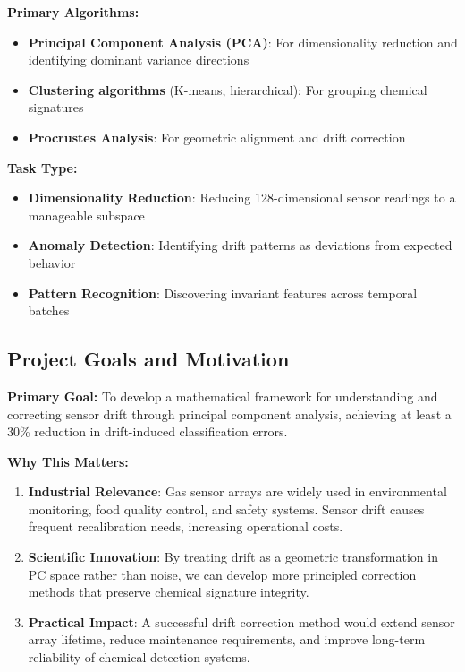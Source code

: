 \documentclass[
  letterpaper,
  DIV=11,
  numbers=noendperiod]{scrartcl}
\providecommand{\tightlist}{%
  \setlength{\itemsep}{0pt}\setlength{\parskip}{0pt}}
\begin{document}
\textbf{Primary Algorithms:}

\begin{itemize}
\tightlist
\item
  \textbf{Principal Component Analysis (PCA)}: For dimensionality
  reduction and identifying dominant variance directions
\item
  \textbf{Clustering algorithms} (K-means, hierarchical): For grouping
  chemical signatures
\item
  \textbf{Procrustes Analysis}: For geometric alignment and drift
  correction
\end{itemize}

\textbf{Task Type:}

\begin{itemize}
\tightlist
\item
  \textbf{Dimensionality Reduction}: Reducing 128-dimensional sensor
  readings to a manageable subspace
\item
  \textbf{Anomaly Detection}: Identifying drift patterns as deviations
  from expected behavior
\item
  \textbf{Pattern Recognition}: Discovering invariant features across
  temporal batches
\end{itemize}

\subsection{Project Goals and
Motivation}\label{project-goals-and-motivation}

\textbf{Primary Goal:} To develop a mathematical framework for
understanding and correcting sensor drift through principal component
analysis, achieving at least a 30\% reduction in drift-induced
classification errors.

\textbf{Why This Matters:}

\begin{enumerate}
\def\labelenumi{\arabic{enumi}.}
\item
  \textbf{Industrial Relevance}: Gas sensor arrays are widely used in
  environmental monitoring, food quality control, and safety systems.
  Sensor drift causes frequent recalibration needs, increasing
  operational costs.
\item
  \textbf{Scientific Innovation}: By treating drift as a geometric
  transformation in PC space rather than noise, we can develop more
  principled correction methods that preserve chemical signature
  integrity.
\item
  \textbf{Practical Impact}: A successful drift correction method would
  extend sensor array lifetime, reduce maintenance requirements, and
  improve long-term reliability of chemical detection systems.
\end{enumerate}
\end{document}
